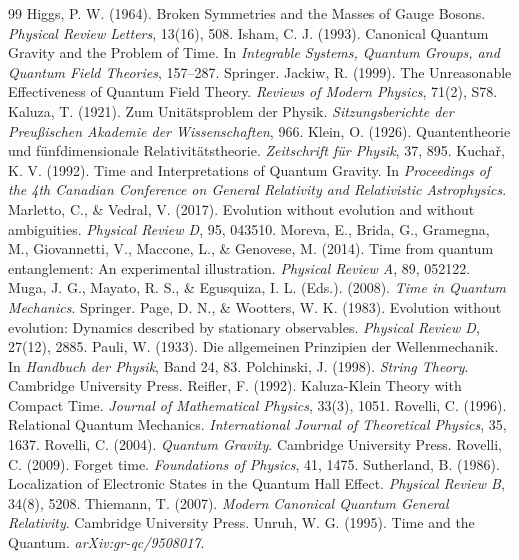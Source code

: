 \documentclass[11pt,a4paper]{article}
\begin{document}
\begin{thebibliography}{99}
Higgs, P. W. (1964). Broken Symmetries and the Masses of Gauge Bosons. \emph{Physical Review Letters}, 13(16), 508.
Isham, C. J. (1993). Canonical Quantum Gravity and the Problem of Time. In \emph{Integrable Systems, Quantum Groups, and Quantum Field Theories}, 157--287. Springer.
Jackiw, R. (1999). The Unreasonable Effectiveness of Quantum Field Theory. \emph{Reviews of Modern Physics}, 71(2), S78.
Kaluza, T. (1921). Zum Unitätsproblem der Physik. \emph{Sitzungsberichte der Preußischen Akademie der Wissenschaften}, 966.
Klein, O. (1926). Quantentheorie und fünfdimensionale Relativitätstheorie. \emph{Zeitschrift für Physik}, 37, 895.
Kuchař, K. V. (1992). Time and Interpretations of Quantum Gravity. In \emph{Proceedings of the 4th Canadian Conference on General Relativity and Relativistic Astrophysics}.
Marletto, C., \& Vedral, V. (2017). Evolution without evolution and without ambiguities. \emph{Physical Review D}, 95, 043510.
Moreva, E., Brida, G., Gramegna, M., Giovannetti, V., Maccone, L., \& Genovese, M. (2014). Time from quantum entanglement: An experimental illustration. \emph{Physical Review A}, 89, 052122.
Muga, J. G., Mayato, R. S., \& Egusquiza, I. L. (Eds.). (2008). \emph{Time in Quantum Mechanics}. Springer.
Page, D. N., \& Wootters, W. K. (1983). Evolution without evolution: Dynamics described by stationary observables. \emph{Physical Review D}, 27(12), 2885.
Pauli, W. (1933). Die allgemeinen Prinzipien der Wellenmechanik. In \emph{Handbuch der Physik}, Band 24, 83.
Polchinski, J. (1998). \emph{String Theory}. Cambridge University Press.
Reifler, F. (1992). Kaluza-Klein Theory with Compact Time. \emph{Journal of Mathematical Physics}, 33(3), 1051.
Rovelli, C. (1996). Relational Quantum Mechanics. \emph{International Journal of Theoretical Physics}, 35, 1637.
Rovelli, C. (2004). \emph{Quantum Gravity}. Cambridge University Press.
Rovelli, C. (2009). Forget time. \emph{Foundations of Physics}, 41, 1475.
Sutherland, B. (1986). Localization of Electronic States in the Quantum Hall Effect. \emph{Physical Review B}, 34(8), 5208.
Thiemann, T. (2007). \emph{Modern Canonical Quantum General Relativity}. Cambridge University Press.
Unruh, W. G. (1995). Time and the Quantum. \emph{arXiv:gr-qc/9508017}.

\end{thebibliography}
\end{document}

